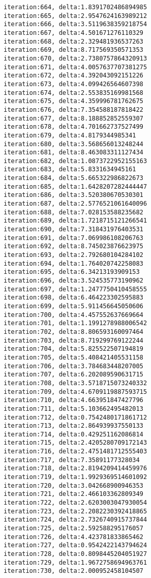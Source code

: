 \documentclass[11pt]{article}
\begin{document}
\begin{Verbatim}[commandchars=\\\{\}]
iteration:664, delta:1.8391702486894985
iteration:665, delta:2.9547624163989212
iteration:666, delta:3.5119638359218754
iteration:667, delta:4.501671276110329
iteration:668, delta:2.329481936537263
iteration:669, delta:8.717569350571353
iteration:670, delta:2.7380757864320913
iteration:671, delta:4.0057637707381275
iteration:672, delta:4.392043092151226
iteration:673, delta:4.099426564607398
iteration:674, delta:2.553835169981568
iteration:675, delta:4.359996781762675
iteration:676, delta:7.354588187818422
iteration:677, delta:8.188852852559307
iteration:678, delta:4.701662737527499
iteration:679, delta:4.8179344985341
iteration:680, delta:3.568656013248244
iteration:681, delta:8.463083311127434
iteration:682, delta:1.0873722952155163
iteration:683, delta:5.8331634945161
iteration:684, delta:5.665322986822673
iteration:685, delta:1.6428207282444447
iteration:686, delta:3.520380670530301
iteration:687, delta:2.5776521061640096
iteration:688, delta:7.028153588235682
iteration:689, delta:1.7218715121266541
iteration:690, delta:7.318431976403531
iteration:691, delta:7.069986108206763
iteration:692, delta:8.745023876623975
iteration:693, delta:2.792680104284102
iteration:694, delta:1.764020742258083
iteration:695, delta:6.34213193909153
iteration:696, delta:3.524535773190962
iteration:697, delta:1.2477750410458555
iteration:698, delta:6.464223302595883
iteration:699, delta:5.911456645050606
iteration:700, delta:4.457552637669664
iteration:701, delta:1.1991278988006542
iteration:702, delta:8.806593160097464
iteration:703, delta:8.719299769122244
iteration:704, delta:5.825522507194819
iteration:705, delta:5.408421405531158
iteration:706, delta:3.784683448207005
iteration:707, delta:6.202089590631715
iteration:708, delta:3.5718715073240332
iteration:709, delta:4.6709119887593715
iteration:710, delta:4.663951847427796
iteration:711, delta:5.103662495482013
iteration:712, delta:0.7542480171861712
iteration:713, delta:2.864939937550133
iteration:714, delta:0.429251162086814
iteration:715, delta:2.4205280709172143
iteration:716, delta:2.4751481712555403
iteration:717, delta:7.35891177328034
iteration:718, delta:2.8194209414459976
iteration:719, delta:1.9929369514601092
iteration:720, delta:3.042668900946353
iteration:721, delta:2.466103362809349
iteration:722, delta:2.6203003047930054
iteration:723, delta:2.2082230392418865
iteration:724, delta:2.7326740915737844
iteration:725, delta:2.592588295176057
iteration:726, delta:4.423781833865462
iteration:727, delta:0.9542422143794624
iteration:728, delta:0.8098445204051927
iteration:729, delta:1.9672758694963761
iteration:730, delta:2.000952458104507

\end{Verbatim}
\end{document}

